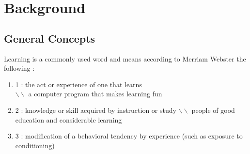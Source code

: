 \documentclass[conference]{IEEEtran}
\begin{document}
\section{Background}\label{sec: Background}


\subsection{General Concepts}\label{subsec: General Concepts}
Learning is a commonly used word and means according to Merriam Webster the following \cite{Learning}:
\begin{enumerate}
	\item[] 1 : the act or experience of one that learns\\
	$\backslash\backslash$ a computer program that makes learning fun
	\item[] 2 : knowledge or skill acquired by instruction or study
	$\backslash\backslash$ people of good education and considerable learning
	\item[] 3 : modification of a behavioral tendency by experience (such as exposure to conditioning)
\end{enumerate}
\end{document}
